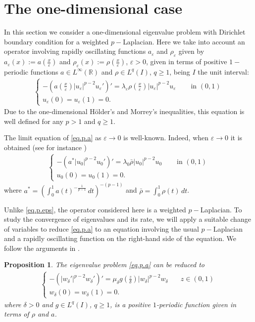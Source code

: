 \documentclass[12pt]{amsart}
\newtheorem{prop}[thm]{Proposition}
\theoremstyle{definition}
\theoremstyle{remark}
\numberwithin{equation}{section}
\begin{document}
\section{The one-dimensional case} \label{sec4}
In this section we consider a one-dimensional eigenvalue problem with Dirichlet boundary condition for a weighted $p-$Laplacian. Here we take into account an operator involving rapidly oscillating functions $a_\varepsilon$ and $\rho_\varepsilon$ given by $a_\varepsilon(x):=a(\tfrac{x}{\varepsilon})$ and $\rho_\varepsilon(x):=\rho(\tfrac{x}{\varepsilon})$, $\varepsilon>0$, given in terms of positive $1-$periodic functions $a\in L^\infty(\mathbb R)$ and $\rho \in L^q(I)$, $q\geq 1$, being $I$ the unit interval: 
\begin{align} \label{eq.p.a}
\begin{cases}
-(a(\tfrac{x}{\varepsilon})| u_\varepsilon|^{p-2}u_\varepsilon ')'=\lambda_\varepsilon \rho(\tfrac{x}{\varepsilon}) |u_\varepsilon|^{p-2}u_\varepsilon &\quad \text{ in } (0,1)\\
u_\varepsilon(0)=u_\varepsilon(1)=0.
\end{cases}
\end{align}
Due to the one-dimensional  H\"older's and Morrey's inequalities, this equation is well defined for any $p>1$ and $q\geq 1$.

The limit equation of \eqref{eq.p.a} as $\varepsilon\to 0$  is well-known. Indeed, when $\varepsilon\to 0$ it is obtained (see for instance \cite{A})
\begin{align} \label{eq.p.a.lim}
\begin{cases}
-(a^* | u_0|^{p-2}u_0 ')'=\lambda_0 \bar \rho |u_0|^{p-2}u_0 &\quad \text{ in } (0,1)\\
u_0(0)=u_0(1)=0.
\end{cases}
\end{align}
where $a^* = \left(\int_0^1 a(t)^{-\frac{1}{p-1}}\,dt \right)^{-(p-1)}$ and $\bar \rho=\int_0^1 \rho(t)\,dt$.

Unlike \eqref{eq.p.eps}, the operator considered here is a weighted $p-$Laplacian. To study the convergence of eigenvalues and its rate, we will apply a suitable change of variables to reduce \eqref{eq.p.a} to an equation involving the usual $p-$Laplacian and a rapidly oscillating function on the right-hand side of the equation. We follow the arguments in \cite{FPS0}.

\begin{prop} \label{cv}
The eigenvalue problem \eqref{eq.p.a} can be reduced to 
\begin{align}    \label{eqqq}
\begin{cases}
-(|  w_\delta'|^{p-2}w_\delta')'  =\mu_\delta g(\tfrac{z}{\delta}) |w_\delta|^{p-2}w_\delta &\quad z\in(0,1)\\
w_\delta(0)=w_\delta(1)=0.
\end{cases}
\end{align}	
where $\delta>0$ and $g\in L^q(I)$, $q\geq1$,  is a positive $1$-periodic function given  in terms of $\rho$ and $a$.
\end{prop}
\end{document}
